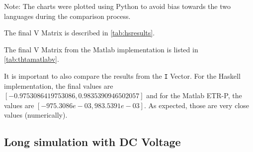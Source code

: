 Note: The charts were plotted using Python to avoid bias towards the two languages during the comparison process.

The final V Matrix is described in \cref{tab:hsresults}.

\begin{table}[H]
\caption{V Matrix calculated for the Haskell implementation. The results go from right to left. Each column represents one step of the iteration}
\label{tab:hsresults}
\end{table}

The final V Matrix from the Matlab implementation is listed in \cref{tab:thtamatlabv}.

\begin{table}[H]
\caption{V Matrix calculated for the Matlab implementation. The results go from left to right.}
\label{tab:thtamatlabv}
\end{table}

It is important to also compare the results from the \lstinline!I! Vector. For the Haskell implementation, the final values are $ [-0.9753086419753086,0.9835390946502057] $ and for the Matlab ETR-P, the values are $ [-975.3086e-03, 983.5391e-03] $. As expected, those are very close values (numerically).


\subsection{ Long simulation with DC Voltage }
\label{longsimmm}

